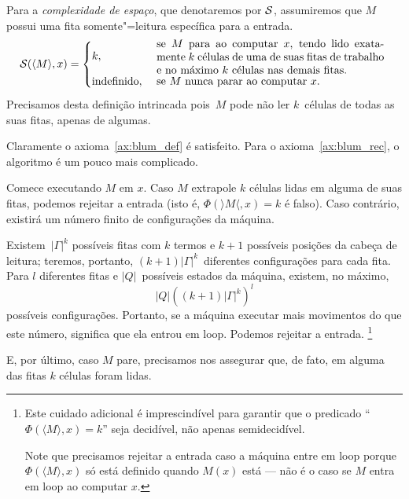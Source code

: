 \begin{example}
    \label{ex:space_complexity}
    Para a \emph{complexidade de espaço},
    que denotaremos por ${\mathcal{S}}$,
    assumiremos que $M$ possui uma fita somente"=leitura
    específica para a entrada.
    \begin{equation*}
        \PhiDS( \langle M \rangle, x) = \begin{cases}
            k, & \text{
                \parbox{0.6\textwidth}{
                    se~$M$ para ao computar~$x$,
                    tendo lido exatamente~$k$ células
                    de uma de suas fitas de trabalho
                    e no máximo $k$~células nas demais fitas.
                }
            } \\
            \text{indefinido}, & \text{
                \parbox{0.6\textwidth}{
                    se $M$ nunca parar ao computar $x$.
                }
            }
        \end{cases}
    \end{equation*}
    Precisamos desta definição intrincada
    pois~$M$ pode não ler $k$~células de todas as suas fitas,
    apenas de algumas.

    Claramente o axioma~\ref{ax:blum_def} é satisfeito.
    Para o axioma~\ref{ax:blum_rec},
    o algoritmo é um pouco mais complicado.

    Comece executando $M$ em $x$.
    Caso $M$ extrapole $k$ células lidas
    em alguma de suas fitas,
    podemos rejeitar a entrada
    (isto é, $\Phi(\rangle M \langle, x) = k$ é falso).
    Caso contrário,
    existirá um número finito de configurações da máquina.

    Existem~$|\Gamma|^k$ possíveis fitas com $k$ termos
    e $k+1$ possíveis posições da cabeça de leitura;
    teremos, portanto,
    $(k+1)|\Gamma|^k$~diferentes configurações para cada fita.
    Para $l$ diferentes fitas e $|Q|$~possíveis estados da máquina,
    existem, no máximo,
    \begin{equation}
        |Q| \left((k+1)|\Gamma|^k\right)^l
        \label{eq:configurations_count}
    \end{equation}
    possíveis configurações.
    Portanto, se a máquina executar
    mais movimentos do que este número,
    significa que ela entrou em loop.
    Podemos rejeitar a entrada.%
    \footnote{
        Este cuidado adicional é imprescindível
        para garantir que o predicado
        ``$\Phi(\langle M \rangle, x) = k$''
        seja decidível,
        não apenas semidecidível.

        Note que precisamos rejeitar a entrada
        caso a máquina entre em loop
        porque $\Phi( \langle M \rangle, x)$ só está definido
        quando $M(x)$ está
        --- não é o caso se $M$ entra em loop
        ao computar $x$.
    }

    E, por último,
    caso $M$ pare,
    precisamos nos assegurar que,
    de fato,
    em alguma das fitas $k$ células foram lidas.
\end{example}

